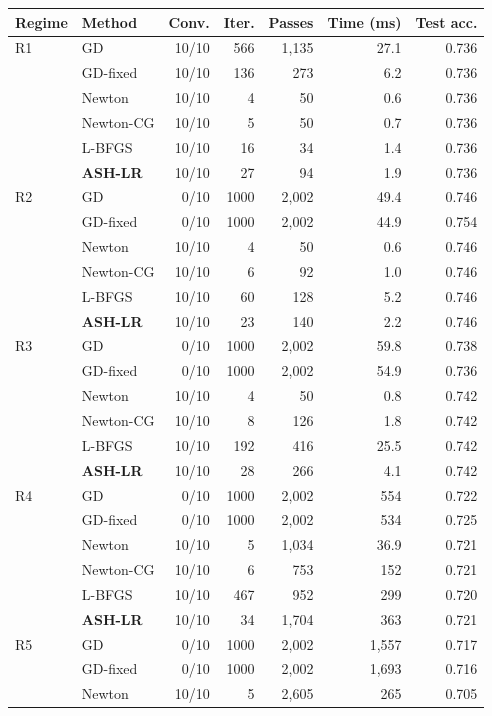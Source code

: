 \begin{tabular}{llrrrrr}
\toprule
Regime & Method & Conv. & Iter. & Passes & Time (ms) & Test acc. \\
\midrule
R1 & GD & 10/10 & 566 & 1,135 & 27.1 & 0.736 \\
 & GD-fixed & 10/10 & 136 & 273 & 6.2 & 0.736 \\
 & Newton & 10/10 & 4 & 50 & 0.6 & 0.736 \\
 & Newton-CG & 10/10 & 5 & 50 & 0.7 & 0.736 \\
 & L-BFGS & 10/10 & 16 & 34 & 1.4 & 0.736 \\
 & \textbf{ASH-LR} & 10/10 & 27 & 94 & 1.9 & 0.736 \\
\midrule
R2 & GD & 0/10 & 1000 & 2,002 & 49.4 & 0.746 \\
 & GD-fixed & 0/10 & 1000 & 2,002 & 44.9 & 0.754 \\
 & Newton & 10/10 & 4 & 50 & 0.6 & 0.746 \\
 & Newton-CG & 10/10 & 6 & 92 & 1.0 & 0.746 \\
 & L-BFGS & 10/10 & 60 & 128 & 5.2 & 0.746 \\
 & \textbf{ASH-LR} & 10/10 & 23 & 140 & 2.2 & 0.746 \\
\midrule
R3 & GD & 0/10 & 1000 & 2,002 & 59.8 & 0.738 \\
 & GD-fixed & 0/10 & 1000 & 2,002 & 54.9 & 0.736 \\
 & Newton & 10/10 & 4 & 50 & 0.8 & 0.742 \\
 & Newton-CG & 10/10 & 8 & 126 & 1.8 & 0.742 \\
 & L-BFGS & 10/10 & 192 & 416 & 25.5 & 0.742 \\
 & \textbf{ASH-LR} & 10/10 & 28 & 266 & 4.1 & 0.742 \\
\midrule
R4 & GD & 0/10 & 1000 & 2,002 & 554 & 0.722 \\
 & GD-fixed & 0/10 & 1000 & 2,002 & 534 & 0.725 \\
 & Newton & 10/10 & 5 & 1,034 & 36.9 & 0.721 \\
 & Newton-CG & 10/10 & 6 & 753 & 152 & 0.721 \\
 & L-BFGS & 10/10 & 467 & 952 & 299 & 0.720 \\
 & \textbf{ASH-LR} & 10/10 & 34 & 1,704 & 363 & 0.721 \\
\midrule
R5 & GD & 0/10 & 1000 & 2,002 & 1,557 & 0.717 \\
 & GD-fixed & 0/10 & 1000 & 2,002 & 1,693 & 0.716 \\
 & Newton & 10/10 & 5 & 2,605 & 265 & 0.705 \\

\end{tabular}
